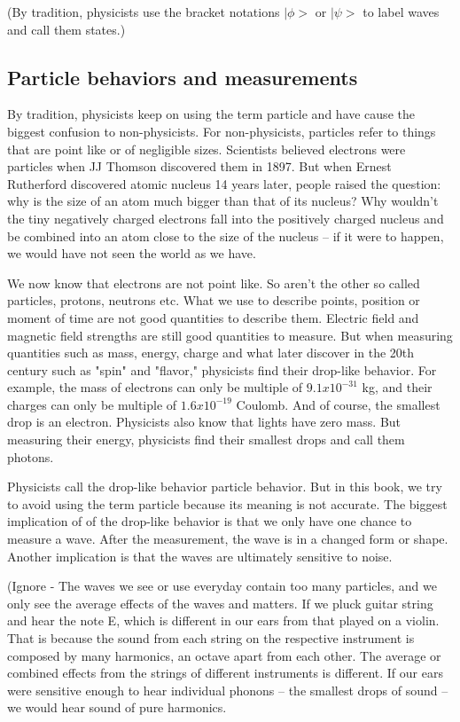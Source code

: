\documentclass{book}
\begin{document}
(By tradition, physicists use the bracket notations $|\phi>$ or $|\psi>$ to label waves and call them states.)

\subsection{Particle behaviors and measurements}
By tradition, physicists keep on using the term particle and have cause the biggest confusion to non-physicists. For non-physicists, particles refer to things that are point like or of negligible sizes. Scientists believed electrons were particles when JJ Thomson discovered them in 1897. But when Ernest Rutherford discovered atomic nucleus 14 years later, people raised the question: why is the size of an atom much bigger than that of its nucleus? Why wouldn't the tiny negatively charged electrons fall into the positively charged nucleus and be combined into an atom close to the size of the nucleus -- if it were to happen, we would have not seen the world as we have.

We now know that electrons are not point like. So aren't the other so called particles, protons, neutrons etc. What we use to describe points, position or moment of time are not good quantities to describe them. Electric field and magnetic field strengths are still good quantities to measure. But when measuring quantities such as mass, energy, charge and what later discover in the 20th century such as "spin" and "flavor," physicists find their drop-like behavior. For example, the mass of electrons can only be multiple of $9.1x10^{-31}$ kg, and their charges can only be multiple of $1.6x10^{-19}$ Coulomb. And of course, the smallest drop is an electron. Physicists also know that lights have zero mass. But measuring their energy, physicists find their smallest drops and call them photons.

Physicists call the drop-like behavior particle behavior. But in this book, we try to avoid using the term particle because its meaning is not accurate. The biggest implication of of the drop-like behavior is that we only have one chance to measure a wave. After the measurement, the wave is in a changed form or shape. Another implication is that the waves are ultimately sensitive to noise.

(Ignore - The waves we see or use everyday contain too many particles, and we only see the average effects of the waves and matters. If we pluck guitar string and hear the note E, which is different in our ears from that played on a violin. That is because the sound from each string on the respective instrument is composed by many harmonics, an octave apart from each other. The average or combined effects from the strings of different instruments is different. If our ears were sensitive enough to hear individual phonons -- the smallest drops of sound -- we would hear sound of pure harmonics.
\end{document}
